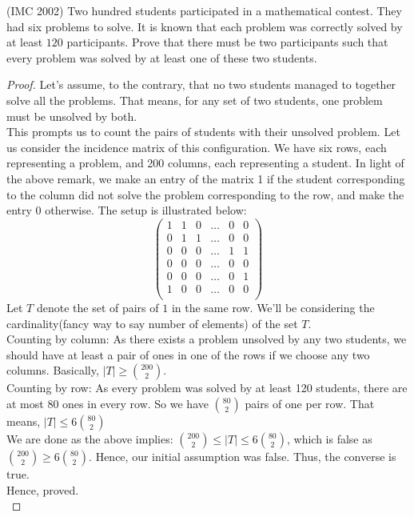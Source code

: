 \begin{example}
    (IMC 2002) Two hundred students participated in a mathematical contest. They had six problems to solve. It is known that each problem was correctly solved by at least $120$ participants. Prove that there must be two participants such that every problem was solved by at least one of these two students.
\end{example}
\begin{proof}
    Let's assume, to the contrary, that no two students managed to together solve all the problems. That means, for any set of two students, one problem must be unsolved by both.\\
    This prompts us to count the pairs of students with their unsolved problem. Let us consider the incidence matrix of this configuration. We have six rows, each representing a problem, and 200 columns, each representing a student. In light of the above remark, we make an entry of the matrix 1 if the student corresponding to the column did not solve the problem corresponding to the row, and make the entry 0 otherwise. The setup is illustrated below:
    \[ \begin{pmatrix}
1 & 1 & 0 & \dots & 0 & 0 \\
0 & 1 & 1 & \dots & 0 & 0 \\
0 & 0 & 0 & \dots & 1 & 1 \\
0 & 0 & 0 & \dots & 0 & 0 \\
0 & 0 & 0 & \dots & 0 & 1 \\
1 & 0 & 0 & \dots & 0 & 0 \\
\end{pmatrix}\]
Let $T$ denote the set of pairs of $1$ in the same row. We'll be considering the cardinality(fancy way to say number of elements) of the set $T$.\\
Counting by column: As there exists a problem unsolved by any two students, we should have at least a pair of ones in one of the rows if we choose any two columns. Basically, $|T| \geq \binom{200}{2}$.\\
Counting by row: As every problem was solved by at least 120 students, there are at most 80 ones in every row.  So we have $\binom{80}{2}$ pairs of one per row. That means, $|T| \leq 6 \binom{80}{2}$\\
We are done as the above implies: $\binom{200}{2} \leq |T| \leq 6 \binom{80}{2}$, which is false as $\binom{200}{2}  \geq 6 \binom{80}{2}$. Hence, our initial assumption was false. Thus, the converse is true. \\
Hence, proved.\\
\end{proof}
